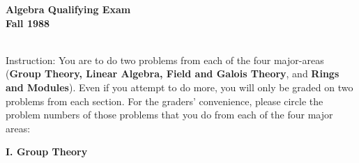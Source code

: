 \documentclass{article}
\begin{document}






\begin{center}\begin{LARGE}
{\bf Algebra Qualifying Exam}\\ 
{\bf Fall 1988}\\ \end{LARGE}
\end{center}
\vspace{0.1in}
\noindent\hrulefill\\

Instruction: You are to do two problems from each of the four major-areas
({\bf Group Theory, Linear Algebra, Field and Galois Theory}, and {\bf Rings
and Modules}). Even if you attempt to do more, you will only be graded on
two problems from each section. For the graders' convenience, please circle
the problem numbers of those problems that you do from each of the four
major areas:

\centerline{{\bf I. Group Theory}}
\end{document}

